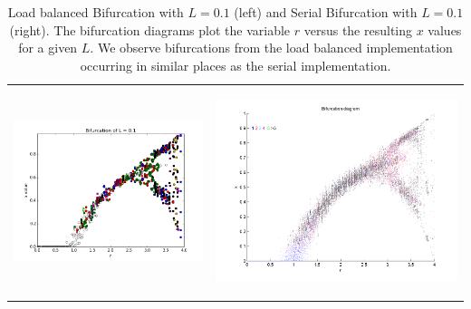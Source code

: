 \documentclass[12pt]{article}
\begin{document}
\begin {table}[H]
\begin{center}
\begin{tabular}{ p{8cm} p{8cm}}    
\begin{center}\includegraphics[scale=0.4]{Bifurcation_L1}\end{center}&\begin{center} \includegraphics[scale=0.4]{bif}\end{center}
\end{tabular}
\caption {Load balanced Bifurcation with $L=0.1$ (left) and Serial
  Bifurcation with $L=0.1$ (right). The bifurcation diagrams plot the
  variable $r$ versus the resulting $x$ values for a given $L$. We
  observe bifurcations from the load balanced implementation occurring
  in similar places as the serial implementation.
} \label{bif}
\end{center}
\end {table}
\end{document}
